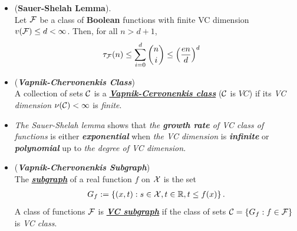 \documentclass[11pt]{article}
\begin{document}
\begin{itemize}
\item \begin{lemma} (\textbf{Sauer-Shelah Lemma}). \citep{vershynin2018high, wainwright2019high}\\
Let ${\mathcal F}$ be a class of \textbf{Boolean} functions with finite VC dimension $v({\mathcal F}) \le d < \infty$. Then, for all $n > d+1$, 
\begin{align}
\tau_{{\mathcal F}}(n) &\le \sum_{i=0}^{d}{{n}\choose{i}}\le \left(\frac{en}{d}\right)^{d} \label{eqn: sauer_lemma}
\end{align}
\end{lemma}


\item \begin{definition}(\textbf{\emph{Vapnik-Chervonenkis Class}})  \citep{gine2021mathematical} \\
A collection of sets ${\mathcal C}$ is a \underline{\emph{\textbf{Vapnik-Cervonenkis class}}} (${\mathcal C}$ is $VC$) if its \emph{VC dimension} $\nu({\mathcal C}) < \infty$ is \emph{finite}.
\end{definition}

\item \begin{remark} 
\emph{The Sauer-Shelah lemma} shows that \emph{the \textbf{growth rate} of VC class of functions} is either \emph{\textbf{exponential}} when \emph{the VC dimension} is \emph{\textbf{infinite}} or \emph{\textbf{polynomial}} up to \emph{the degree of VC dimension}.
\end{remark}

\item \begin{definition}(\textbf{\emph{Vapnik-Chervonenkis Subgraph}})  \citep{gine2021mathematical} \\
The \underline{\emph{\textbf{subgraph}}} of a real function $f$ on ${\mathcal X}$ is the set
\begin{align*}
G_f := \left\{(x, t): s\in {\mathcal X}, t\in {\mathbb R}, t\le f(x) \right\}.
\end{align*}
A class of functions ${\mathcal F}$ is \underline{\emph{\textbf{VC subgraph}}} if the class of sets ${\mathcal C} = \left\{G_f : f \in {\mathcal F}\right\}$ is \emph{VC class}.
\end{definition}
\end{itemize}
\end{document}
